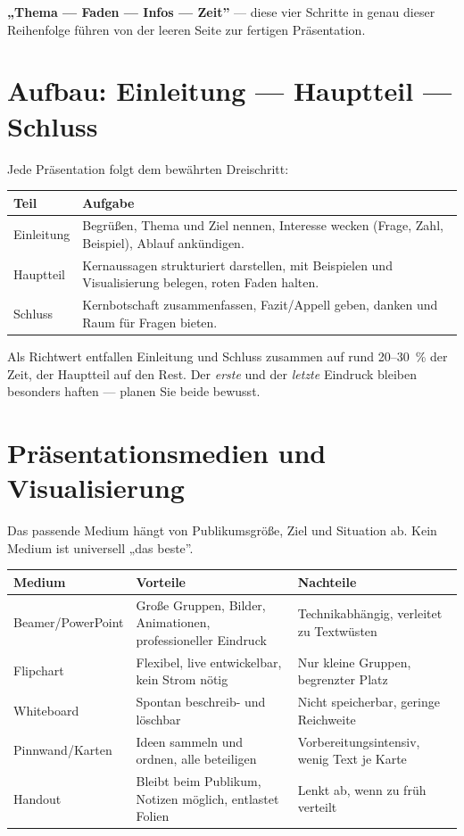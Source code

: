 \documentclass[11pt, a4paper]{article}
\begin{document}
\begin{eselsbruecke}
\textbf{„Thema --- Faden --- Infos --- Zeit”} --- diese vier Schritte in genau dieser
Reihenfolge führen von der leeren Seite zur fertigen Präsentation.
\end{eselsbruecke}

\section{Aufbau: Einleitung --- Hauptteil --- Schluss}

Jede Präsentation folgt dem bewährten Dreischritt:

\begin{center}
\begin{tabular}{p{3cm} p{10.5cm}}
\toprule
\textbf{Teil} & \textbf{Aufgabe}\\
\midrule
Einleitung & Begrüßen, Thema und Ziel nennen, Interesse wecken (Frage, Zahl, Beispiel), Ablauf ankündigen.\\
Hauptteil & Kernaussagen strukturiert darstellen, mit Beispielen und Visualisierung belegen, roten Faden halten.\\
Schluss & Kernbotschaft zusammenfassen, Fazit/Appell geben, danken und Raum für Fragen bieten.\\
\bottomrule
\end{tabular}
\end{center}

\medskip
Als Richtwert entfallen Einleitung und Schluss zusammen auf rund 20--30~\% der Zeit, der
Hauptteil auf den Rest. Der \emph{erste} und der \emph{letzte} Eindruck bleiben besonders
haften --- planen Sie beide bewusst.

\section{Präsentationsmedien und Visualisierung}

Das passende Medium hängt von Publikumsgröße, Ziel und Situation ab. Kein Medium ist
universell „das beste”.

\begin{center}
\begin{tabular}{p{3.2cm} p{5cm} p{5cm}}
\toprule
\textbf{Medium} & \textbf{Vorteile} & \textbf{Nachteile}\\
\midrule
Beamer/PowerPoint & Große Gruppen, Bilder, Animationen, professioneller Eindruck & Technikabhängig, verleitet zu Textwüsten\\
Flipchart & Flexibel, live entwickelbar, kein Strom nötig & Nur kleine Gruppen, begrenzter Platz\\
Whiteboard & Spontan beschreib- und löschbar & Nicht speicherbar, geringe Reichweite\\
Pinnwand/Karten & Ideen sammeln und ordnen, alle beteiligen & Vorbereitungsintensiv, wenig Text je Karte\\
Handout & Bleibt beim Publikum, Notizen möglich, entlastet Folien & Lenkt ab, wenn zu früh verteilt\\
\bottomrule
\end{tabular}
\end{center}
\end{document}
